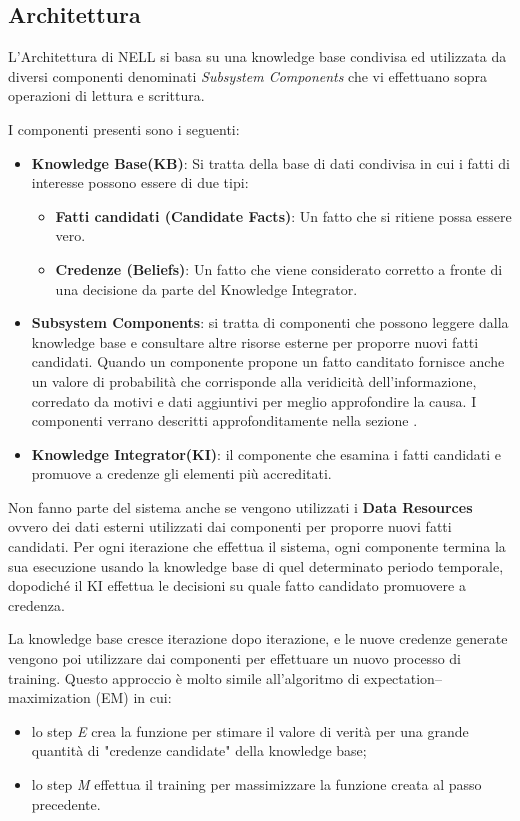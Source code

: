 \subsection{Architettura}
L'Architettura di NELL si basa su una knowledge base condivisa ed utilizzata da diversi componenti denominati \textit{Subsystem Components} che vi effettuano sopra operazioni di lettura e scrittura. 

I componenti presenti sono i seguenti:
\begin{itemize}
    \item \textbf{Knowledge Base(KB)}: Si tratta della base di dati condivisa in cui i fatti di interesse possono essere di due tipi:
    \begin{itemize}
        \item \textbf{Fatti candidati (Candidate Facts)}: Un fatto che si ritiene possa essere vero.
        \item \textbf{Credenze (Beliefs)}: Un fatto che viene considerato corretto a fronte di una decisione da parte del Knowledge Integrator.
    \end{itemize}
    \item \textbf{Subsystem Components}: si tratta di componenti che possono leggere dalla knowledge base e consultare altre risorse esterne per proporre nuovi fatti candidati.
    Quando un componente propone un fatto canditato fornisce anche un valore di probabilità che corrisponde alla veridicità dell'informazione, corredato da motivi e dati aggiuntivi per meglio approfondire la causa. I componenti verrano descritti approfonditamente nella sezione .
    \item \textbf{Knowledge Integrator(KI)}: il componente che esamina i fatti candidati e promuove a credenze gli elementi più accreditati.
\end{itemize}

\noindent Non fanno parte del sistema anche se vengono utilizzati i \textbf{Data Resources} ovvero dei dati esterni utilizzati dai componenti per proporre nuovi fatti candidati. Per ogni iterazione che effettua il sistema, ogni componente termina la sua esecuzione usando la knowledge base di quel determinato periodo temporale, dopodiché il KI effettua le decisioni su quale fatto candidato promuovere a credenza.


\noindent La knowledge base cresce iterazione dopo iterazione, e le nuove credenze generate vengono poi utilizzare dai componenti per effettuare un nuovo processo di training. Questo approccio è molto simile all'algoritmo di expectation–maximization (EM) in cui:
\begin{itemize}
    \item lo step \textit{E} crea la funzione per stimare il valore di verità per una grande quantità di "credenze candidate" della knowledge base;
    \item lo step \textit{M} effettua il training per massimizzare la funzione creata al passo precedente\cite{TowardAnArchitecture:online}.
\end{itemize}

